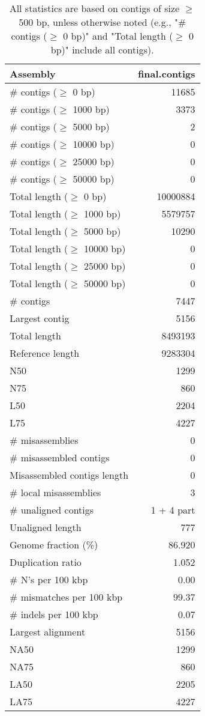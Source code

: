\documentclass[12pt,a4paper]{article}
\begin{document}
\begin{table}[ht]
\begin{center}
\caption{All statistics are based on contigs of size $\geq$ 500 bp, unless otherwise noted (e.g., "\# contigs ($\geq$ 0 bp)" and "Total length ($\geq$ 0 bp)" include all contigs).}
\begin{tabular}{|l*{1}{|r}|}
\hline
Assembly & final.contigs \\ \hline
\# contigs ($\geq$ 0 bp) & 11685 \\ \hline
\# contigs ($\geq$ 1000 bp) & 3373 \\ \hline
\# contigs ($\geq$ 5000 bp) & 2 \\ \hline
\# contigs ($\geq$ 10000 bp) & 0 \\ \hline
\# contigs ($\geq$ 25000 bp) & 0 \\ \hline
\# contigs ($\geq$ 50000 bp) & 0 \\ \hline
Total length ($\geq$ 0 bp) & 10000884 \\ \hline
Total length ($\geq$ 1000 bp) & 5579757 \\ \hline
Total length ($\geq$ 5000 bp) & 10290 \\ \hline
Total length ($\geq$ 10000 bp) & 0 \\ \hline
Total length ($\geq$ 25000 bp) & 0 \\ \hline
Total length ($\geq$ 50000 bp) & 0 \\ \hline
\# contigs & 7447 \\ \hline
Largest contig & 5156 \\ \hline
Total length & 8493193 \\ \hline
Reference length & 9283304 \\ \hline
N50 & 1299 \\ \hline
N75 & 860 \\ \hline
L50 & 2204 \\ \hline
L75 & 4227 \\ \hline
\# misassemblies & 0 \\ \hline
\# misassembled contigs & 0 \\ \hline
Misassembled contigs length & 0 \\ \hline
\# local misassemblies & 3 \\ \hline
\# unaligned contigs & 1 + 4 part \\ \hline
Unaligned length & 777 \\ \hline
Genome fraction (\%) & 86.920 \\ \hline
Duplication ratio & 1.052 \\ \hline
\# N's per 100 kbp & 0.00 \\ \hline
\# mismatches per 100 kbp & 99.37 \\ \hline
\# indels per 100 kbp & 0.07 \\ \hline
Largest alignment & 5156 \\ \hline
NA50 & 1299 \\ \hline
NA75 & 860 \\ \hline
LA50 & 2205 \\ \hline
LA75 & 4227 \\ \hline
\end{tabular}
\end{center}
\end{table}
\end{document}
